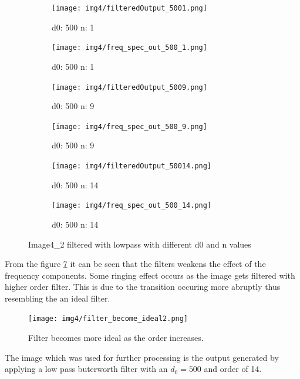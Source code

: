 \begin{figure}[H]
    
      \begin{subfigure}[b]{0.16\textwidth}
        \texttt{[image: img4/filteredOutput\_5001.png]}
        \caption{d0: 500 n: 1}
        \label{fig:img4_5001_im}
    \end{subfigure}
    \begin{subfigure}[b]{0.16\textwidth}
        \texttt{[image: img4/freq\_spec\_out\_500\_1.png]}
        \caption{d0: 500 n: 1}
        \label{fig:img4_5001_fr}
    \end{subfigure}
	 \begin{subfigure}[b]{0.16\textwidth}
        \texttt{[image: img4/filteredOutput\_5009.png]}
        \caption{d0: 500 n: 9}
        \label{fig:img4_5009_im}
    \end{subfigure}
    \begin{subfigure}[b]{0.16\textwidth}
        \texttt{[image: img4/freq\_spec\_out\_500\_9.png]}
        \caption{d0: 500 n: 9}
        \label{fig:img4_5009_fr}
    \end{subfigure}	
\begin{subfigure}[b]{0.16\textwidth}
        \texttt{[image: img4/filteredOutput\_50014.png]}
        \caption{d0: 500 n: 14}
        \label{fig:img4_50014_im}
    \end{subfigure}
    \begin{subfigure}[b]{0.16\textwidth}
        \texttt{[image: img4/freq\_spec\_out\_500\_14.png]}
        \caption{d0: 500 n: 14}
        \label{fig:img4_50014_fr}
    \end{subfigure}
 	\caption{Image4\_2 filtered with lowpass with different d0 and n values}
 	\label{fig:lowpass_all}
\end{figure}

From the figure \ref{fig:lowpass_all} it can be seen that the filters weakens the effect of the frequency components. Some ringing effect occurs as the image gets filtered with higher order filter. This is due to the transition occuring more abruptly thus resembling the an ideal filter. 

\begin{figure}[H]
	\centering
	\texttt{[image: img4/filter\_become\_ideal2.png]}
	\caption{Filter becomes more ideal as the order increases.}
    \label{fig:filter_become_ideal}
\end{figure}


The image which was used for further processing is the output generated by applying a low pass buterworth filter with an $d_0 = 500$ and order of 14. \\
 
